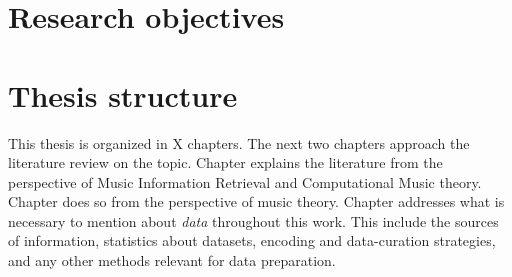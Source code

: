 \section{Research objectives}


\section{Thesis structure}
This thesis is organized in X chapters. 
The next two chapters approach the literature review on the topic.
Chapter  explains the literature from the perspective of Music Information Retrieval and Computational Music theory.
Chapter  does so from the perspective of music theory.
Chapter  addresses what is necessary to mention about \emph{data} throughout this work.
This include the sources of information, statistics about datasets, encoding and data-curation strategies, and any other methods relevant for data preparation.



